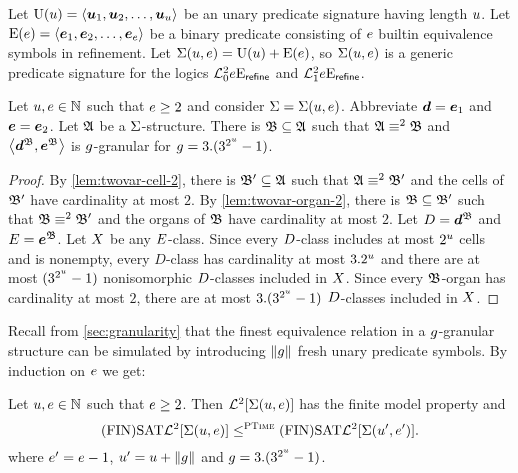 
Let $\mathrm{U}(u) = \left\langle \bm{u}_{1},\bm{u}_{2},\dots,\bm{u}_{u} \right\rangle$ be an unary predicate
signature having length $u$.
Let $\mathrm{E}(e) = \left\langle \bm{e}_{1},\bm{e}_{2},\dots,\bm{e}_{e} \right\rangle$ be a binary predicate
consisting of $e$ builtin equivalence symbols in refinement.
Let $\mathrm{\Sigma}(u,e) = \mathrm{U}(u) + \mathrm{E}(e)$, so $\mathrm{\Sigma}(u,e)$ is a generic
predicate signature for the logics $\mathcal{L}^{2}_{0}{e}\mathrm{E}_{\mathsf{refine}}$ and
$\mathcal{L}^{2}_{1}{e}\mathrm{E}_{\mathsf{refine}}$.

\begin{remark}\label{rem:twovar-granular}
Let $u, e \in \mathbb{N}$ such that $e \geq 2$ and consider
$\mathrm{\Sigma} = \mathrm{\Sigma}(u,e)$.
Abbreviate $\bm{d} = \bm{e}_{1}$ and $\bm{e} = \bm{e}_{2}$.
Let $\mathfrak{A}$ be a $\mathrm{\Sigma}$-structure.
There is $\mathfrak{B} \subseteq \mathfrak{A}$ such that
$\mathfrak{A} \equiv^{2} \mathfrak{B}$ and $\left\langle \bm{d}^{\mathfrak{B}},\bm{e}^{\mathfrak{B}} \right\rangle$ is $g$-granular
for $g = 3.(3^{2^u}-1)$.
\end{remark}
\begin{proof}
By \cref{lem:twovar-cell-2}, there is $\mathfrak{B'} \subseteq \mathfrak{A}$ such that
$\mathfrak{A} \equiv^{2} \mathfrak{B'}$ and the cells of $\mathfrak{B'}$ have cardinality at most $2$.
By \cref{lem:twovar-organ-2}, there is $\mathfrak{B} \subseteq \mathfrak{B'}$ such that
$\mathfrak{B} \equiv^{2} \mathfrak{B'}$ and the organs of $\mathfrak{B}$ have cardinality at most $2$.
Let $D = \bm{d}^{\mathfrak{B}}$ and $E = \bm{e}^{\mathfrak{B}}$.
Let $X$ be any $E$-class.
Since every $D$-class includes at most $2^u$ cells and is nonempty, every
$D$-class has cardinality at most $3.2^u$ and there are at most
$(3^{2^u}-1)$ nonisomorphic $D$-classes included in $X$.
Since every $\mathfrak{B}$-organ has cardinality at most $2$, there are at most
$3.(3^{2^u}-1)$ $D$-classes included in $X$.
\end{proof}
Recall from \cref{sec:granularity} that the finest equivalence relation in a
$g$-granular structure can be simulated by introducing $\|g\|$ fresh unary
predicate symbols.
By induction on $e$ we get:
\begin{corollary}\label{cor:twovar-sub-1}
Let $u,e \in \mathbb{N}$ such that $e \geq 2$.
Then $\mathcal{L}^{2}[\mathrm{\Sigma}(u,e)]$ has the finite model property and
\[
  \mathrm{(FIN)SAT}\mathcal{L}^{2}[\mathrm{\Sigma}(u,e)] \leq^{\text{\normalfont{\scshape PTime}}}
  \mathrm{(FIN)SAT}\mathcal{L}^{2}[\mathrm{\Sigma}({u'},{e'})].
\]
where ${e'} = e - 1$, ${u'} = u + \|g\|$ and
$g = 3.(3^{2^u} - 1)$.
\end{corollary}

